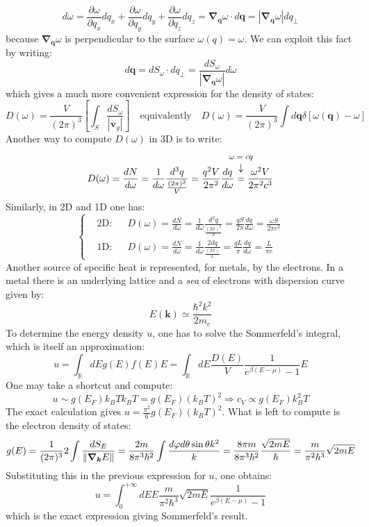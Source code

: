 \documentclass[10.75pt,a4paper,openright,bottom=2cm]{article}
\renewcommand{\Vec}[1]{\boldsymbol{#1}}
\begin{document}
\[
d\omega=\frac{\partial\omega}{\partial q_x}dq_x+\frac{\partial\omega}{\partial q_y}dq_y+\frac{\partial\omega}{\partial q_z}dq_z=\Vec{\nabla}_{\Vec{q}}\omega\cdot d\Vec{q}=|\Vec{\nabla}_{\Vec{q}}\omega|dq_\perp
\]
because $\Vec{\nabla}_{\Vec{q}}\omega$ is perpendicular to the surface $\omega(q)=\omega$. We can exploit this fact by writing: 
\[
d\Vec{q}=dS_\omega\cdot dq_\perp=\frac{dS_\omega}{|\Vec{\nabla}_{\Vec{q}}\omega|}d\omega
\]
which gives a much more convenient expression for the density of states:
\[
D(\omega)=\frac{V}{(2\pi)^3}\left[\int_S\frac{dS_\omega}{|\Vec{v}_g|}\right] \quad \text{equivalently} \quad D(\omega)=\frac{V}{(2\pi)^3}\int d\Vec{q}\delta[\omega(\Vec{q})-\omega]
\]
Another way to compute $D(\omega)$ in 3D is to write:
\[
D(\omega)=\frac{dN}{d\omega}=\frac{1}{d\omega}\frac{d^3q}{\frac{(2\pi)^3}{V}}=\frac{q^2V}{2\pi^2}\frac{dq}{d\omega}\overset{\mathclap{\tikz \node {$\downarrow$} node [above=1ex] {\footnotesize $\omega=cq$};}}{=}\frac{\omega^2V}{2\pi^2c^3}
\]
Similarly, in 2D and 1D one has:
\[
\left\{
\begin{aligned}
&\text{2D:} &&D(\omega)=\frac{dN}{d\omega}=\frac{1}{d\omega}\frac{d^2q}{\frac{(2\pi)^2}{S}}=\frac{qS}{2\pi}\frac{dq}{d\omega}=\frac{\omega S}{2\pi c^2}\\
&\text{1D:} &&D(\omega)=\frac{dN}{d\omega}=\frac{1}{d\omega}\frac{2dq}{\frac{(2\pi)}{L}}=\frac{qL}{\pi}\frac{dq}{d\omega}=\frac{L}{\pi c}
\end{aligned}
\right.
\]
Another source of specific heat is represented, for metals, by the electrons. In a metal there is an underlying lattice and a \textit{sea} of electrons with dispersion curve given by:
\[
E(\Vec{k})\simeq\frac{\hbar^2k^2}{2m_e}
\]
To determine the energy density $u$, one has to solve the Sommerfeld's integral, which is itself an approximation:
\[
u=\int_\mathbb{R}dEg(E)f(E)E=\int_\mathbb{R}dE\frac{D(E)}{V}\frac{1}{e^{\beta(E-\mu)}-1}E
\]
One may take a shortcut and compute:
\[
u\sim g(E_F)k_BTk_BT=g(E_F)(k_BT)^2\Rightarrow c_V\propto g(E_F)k_B^2T
\]
The exact calculation gives $u=\frac{\pi^2}{6}g(E_F)(k_BT)^2$. What is left to compute is the electron density of states:
\begin{equation}
\label{density}
g(E)=\frac{1}{(2\pi)^3}2\int\frac{dS_E}{\norm{\Vec{\nabla}_{\Vec{k}}E}}=\frac{2 m}{8\pi^3\hbar^2}\int\frac{d\varphi d\theta\sin\theta k^2}{k}=\frac{8\pi m}{8\pi^3\hbar^2}\frac{\sqrt{2mE}}{\hbar}=\frac{m}{\pi^2\hbar^3}\sqrt{2mE}
\end{equation}
Substituting this in the previous expression for $u$, one obtains:
\[
u=\int_0^{+\infty}dEE\frac{m}{\pi^2\hbar^3}\sqrt{2mE}\frac{1}{e^{\beta(E-\mu)}-1}
\]
which is the exact expression giving Sommerfeld's result.
\newpage
\end{document}
